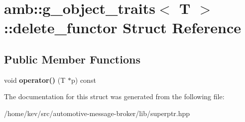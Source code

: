 \hypertarget{structamb_1_1g__object__traits_3_01T_01_4_1_1delete__functor}{\section{amb\+:\+:g\+\_\+object\+\_\+traits$<$ T $>$\+:\+:delete\+\_\+functor Struct Reference}
\label{structamb_1_1g__object__traits_3_01T_01_4_1_1delete__functor}
}
\subsection*{Public Member Functions}
\begin{DoxyCompactItemize}
\item 
\hypertarget{structamb_1_1g__object__traits_3_01T_01_4_1_1delete__functor_a5b0e7355b1a033116884f05c59ad4040}{void {\bfseries operator()} (T $\ast$p) const }\label{structamb_1_1g__object__traits_3_01T_01_4_1_1delete__functor_a5b0e7355b1a033116884f05c59ad4040}

\end{DoxyCompactItemize}


The documentation for this struct was generated from the following file\+:\begin{DoxyCompactItemize}
\item 
/home/kev/src/automotive-\/message-\/broker/lib/superptr.\+hpp\end{DoxyCompactItemize}
